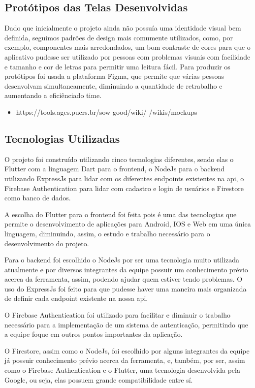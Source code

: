 \subsection{Protótipos das Telas Desenvolvidas}
Dado que inicialmente o projeto ainda não possuía uma identidade visual bem 
definida, seguimos padrões de design mais comumente utilizados, como, por exemplo, componentes mais arredondados, um bom contraste de cores para que o aplicativo pudesse ser utilizado 
por pessoas com problemas visuais com facilidade e tamanho e cor de letras para 
permitir uma leitura fácil. Para produzir os protótipos foi usada a plataforma Figma\cite{figma}, que permite que várias pessoas desenvolvam simultaneamente, diminuindo a quantidade de retrabalho e aumentando a eficiênciado time.

\begin{itemize}
  \item https://tools.ages.pucrs.br/sow-good/wiki/-/wikis/mockups
\end{itemize}

\subsection{Tecnologias Utilizadas}

O projeto foi construído utilizando cinco tecnologias diferentes, sendo elas o 
Flutter\cite{flutter} com a linguagem Dart\cite{dart} para o frontend, o NodeJs\cite{nodejs} para o backend utilizando ExpressJs\cite{expressjs} para lidar com os diferentes endpoints existentes na \ac{api}, o Firebase Authentication\cite{firebaseauth} para lidar com cadastro e login de usuários e Firestore\cite{firestore} como banco de dados.

A escolha do Flutter\cite{flutter} para o frontend foi feita pois é uma das tecnologias que 
permite o desenvolvimento de aplicações para Android, IOS e Web em uma única 
linguagem, diminuindo, assim, o estudo e trabalho necessário para o desenvolvimento 
do projeto.

Para o backend foi escolhido o NodeJs\cite{nodejs} por ser uma tecnologia muito utilizada 
atualmente e por diversos integrantes da equipe possuir um conhecimento prévio 
acerca da ferramenta, assim, podendo ajudar quem estiver tendo problemas. O uso 
do ExpressJs\cite{expressjs} foi feito para que pudesse haver uma maneira mais organizada de definir cada endpoint existente na nossa \ac{api}. 

O Firebase Authentication\cite{firebaseauth} foi utilizado para facilitar e diminuir o trabalho 
necessário para a implementação de um sistema de autenticação, permitindo que a equipe foque em outros pontos importantes da aplicação. 

O Firestore\cite{firestore}, assim como o NodeJs\cite{nodejs}, foi escolhido por alguns 
integrantes da equipe já possuir conhecimento prévio acerca da ferramenta, e, 
também, por ser, assim como o Firebase Authentication\cite{firebaseauth} e o Flutter\cite{flutter}, uma tecnologia desenvolvida pela Google\cite{google}, ou seja, elas possuem grande compatibilidade entre sí.